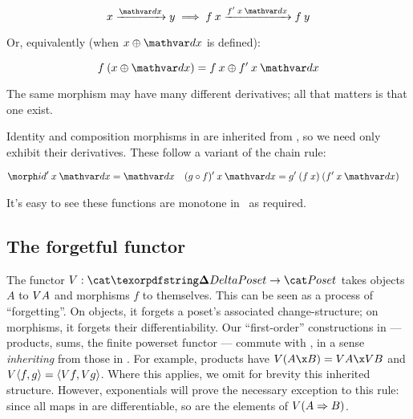 \nopagebreak[2]
\[ \vld{\dx} x y \implies \vld{\deriv f\<x\<\dx}{f\<x}{f\<y}\]

\noindent Or, equivalently (when $x \upd \dx$ is defined):

\nopagebreak[2]
\[ f\<(x \upd \dx) = f\<x \upd \deriv f\<x\<\dx \]

\noindent
The same morphism may have many different derivatives; all that matters is that
one exist.

Identity and composition morphisms in \CP{} are inherited from \Poset{}, so we
need only exhibit their derivatives. These follow a variant of the chain rule:

\nopagebreak[2]
\begin{align*}
  \deriv\id \<x\<\dx &= \dx
  & \deriv{(g \circ f)} \<x\<\dx &= \deriv g \<(f\<x) \<(\deriv f\<x\<\dx)
\end{align*}

\noindent
It's easy to see these functions are monotone in \dx\ as required.


\subsection{\texorpdfstring{\boldmath}{}The forgetful functor \valfn}
\label{sec:CP-vals}

The functor $\valfn : \CP \to \Poset$ takes objects $A$ to $V A$ and
morphisms $f$ to themselves. This can be seen as a process of ``forgetting''. On
objects, it forgets a poset's associated change-structure; on morphisms, it
forgets their differentiability.
%
Our ``first-order'' constructions in \CP{} --- products, sums, the finite
powerset functor --- commute with \valfn, in a sense \emph{inheriting} from
those in \Poset. For example, products have $\vals{(A \x B)} = \vals A \x \vals
B$ and $V{\langle{f,g}\rangle} = \langle{\ensuremath{V}f, \ensuremath{V}g}\rangle$.
%
Where this applies, we omit for brevity this inherited structure.
%
However, exponentials will prove the necessary exception to this rule: since all
maps in \CP{} are differentiable, so are the elements of $V{(A \Rightarrow B)}$.




